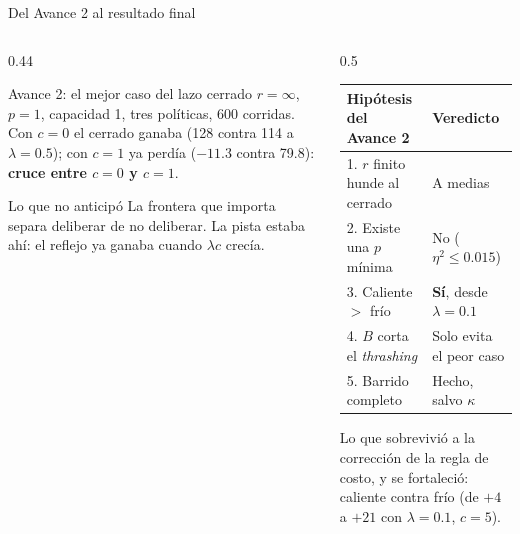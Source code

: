 \documentclass[aspectratio=169]{beamer}
\begin{document}
\begin{frame}{Del Avance 2 al resultado final}
  \begin{columns}[T]
    \begin{column}{0.44\textwidth}
      \begin{block}{Avance 2: el mejor caso del lazo cerrado}
        \small $r=\infty$, $p=1$, capacidad 1, tres políticas, 600 corridas.
        Con $c=0$ el cerrado ganaba (128 contra 114 a $\lambda=0.5$); con
        $c=1$ ya perdía (\mbox{$-11.3$} contra 79.8): \textbf{cruce entre
        $c=0$ y $c=1$}.
      \end{block}
      \begin{alertblock}{Lo que no anticipó}
        \small La frontera que importa separa deliberar de no deliberar. La
        pista estaba ahí: el reflejo ya ganaba cuando $\lambda c$ crecía.
      \end{alertblock}
    \end{column}
    \begin{column}{0.5\textwidth}
      \footnotesize
      \renewcommand{\arraystretch}{1.25}
      \setlength{\tabcolsep}{4pt}
      \begin{tabular}{@{}l l@{}}
        \toprule
        \textbf{Hipótesis del Avance 2} & \textbf{Veredicto} \\
        \midrule
        1. $r$ finito hunde al cerrado & A medias \\
        2. Existe una $p$ mínima & No ($\eta^2\le0.015$) \\
        3. Caliente $>$ frío & \textbf{Sí}, desde $\lambda=0.1$ \\
        4. $B$ corta el \emph{thrashing} & Solo evita el peor caso \\
        5. Barrido completo & Hecho, salvo $\kappa$ \\
        \bottomrule
      \end{tabular}

      \vspace{0.8em}
      \small Lo que sobrevivió a la corrección de la regla de costo, y se
      fortaleció: caliente contra frío (de $+4$ a $+21$ con $\lambda=0.1$,
      $c=5$).
    \end{column}
  \end{columns}
\end{frame}
\end{document}
